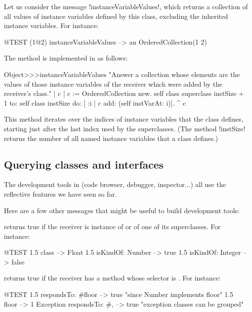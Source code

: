 \documentclass[a4paper,10pt,twoside]{book}
\begin{document}
Let us consider the message \ct!instanceVariableValues!, which returns a collection of all values of instance variables defined by this class, excluding the inherited instance variables.
For instance:
\begin{code}{@TEST}
(1@2) instanceVariableValues --> an OrderedCollection(1 2)
\end{code}

The method is implemented in  as follows:
\begin{code}{}
Object>>>instanceVariableValues
	"Answer a collection whose elements are the values of those instance variables of the receiver which were added by the receiver's class."	
	| c |
	c := OrderedCollection new.
	self class superclass instSize + 1
		to: self class instSize
		do: [ :i | c add: (self instVarAt: i)].
	^ c
\end{code}

This method iterates over the indices of instance variables that the class defines, starting just after the last index used by the superclasses.
(The method \ct!instSize! returns the number of all named instance variables that a class defines.)

\subsection{Querying classes and interfaces}

The development tools in \pharo (code browser, debugger, inspector...) all use the reflective features we have seen so far.

Here are a few other messages that might be useful to build development tools:

 returns true if the receiver is instance of  or of one of its superclasses.
For instance:
\begin{code}{@TEST}
1.5 class                     --> Float
1.5 isKindOf: Number --> true
1.5 isKindOf: Integer   --> false
\end{code}

 returns true if the receiver has a method whose selector is .
For instance:
\begin{code}{@TEST}
1.5 respondsTo: #floor      --> true    "since Number implements floor"
1.5 floor                            --> 1
Exception respondsTo: #, --> true    "exception classes can be grouped"
\end{code}
\end{document}
